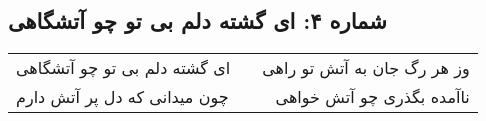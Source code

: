 \begin{center}
\section*{شماره ۴: ای گشته دلم بی تو چو آتشگاهی}
\label{sec:004}
\begin{longtable}{l p{0.5cm} r}
ای گشته دلم بی تو چو آتشگاهی
&&
وز هر رگ جان به آتش تو راهی
\\
چون میدانی که دل پر آتش دارم
&&
ناآمده بگذری چو آتش خواهی
\\
\end{longtable}
\end{center}
